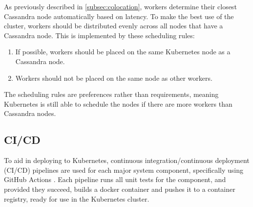 As previously described in \ref{subsec:colocation}, workers determine their closest Cassandra node automatically based on latency. To make the best use of the cluster, workers should be distributed evenly across all nodes that have a Cassandra node. This is implemented by these scheduling rules:
\begin{enumerate}
	\item If possible, workers should be placed on the same Kubernetes node as a Cassandra node.
	\item Workers should not be placed on the same node as other workers.
\end{enumerate}

The scheduling rules are preferences rather than requirements, meaning Kubernetes is still able to schedule the nodes if there are more workers than Cassandra nodes.

\subsection{CI/CD}
To aid in deploying to Kubernetes, continuous integration/continuous deployment (CI/CD) pipelines are used for each major system component, specifically using GitHub Actions \cite{githubactions}. Each pipeline runs all unit tests for the component, and provided they succeed, builds a docker container and pushes it to a container registry, ready for use in the Kubernetes cluster.

